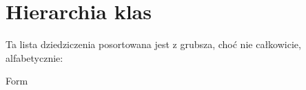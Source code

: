\section{Hierarchia klas}
Ta lista dziedziczenia posortowana jest z grubsza, choć nie całkowicie, alfabetycznie\+:\begin{DoxyCompactList}
\item {}
\item Form\begin{DoxyCompactList}
\item {}
\end{DoxyCompactList}
\end{DoxyCompactList}
